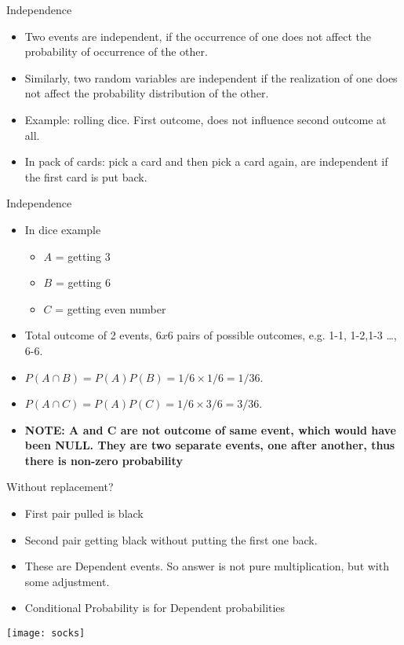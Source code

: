 \begin{frame}{Independence }

\begin{itemize}
\item Two events are independent, if the occurrence of one does not affect the probability of occurrence of the other.
\item Similarly, two random variables are independent if the realization of one does not affect the
probability distribution of the other.
\item Example: rolling dice. First outcome, does not influence second outcome at all.
\item In pack of cards: pick a card and then pick a card again, are independent if the first card is put back.
\end{itemize}
\end{frame}

\begin{frame}{Independence }
\begin{itemize}
\item In dice example  
\begin{itemize}
\item $A$  = getting 3  
\item  $B$ = getting 6
\item  $C$ = getting even number
\end{itemize}
\item Total outcome of 2 events, $6x6$ pairs of possible outcomes, e.g. 1-1, 1-2,1-3 \ldots, 6-6.
\item $P(A \cap B) = P(A)P(B) = 1/6 \times 1/6 = 1/36$. 
\item $P(A \cap C) = P(A)P(C) = 1/6 \times 3/6 = 3/36$. 
\item {\bf NOTE: A and C are not outcome of same event, which would have been NULL. They are two separate events, one after another, thus there is non-zero probability}
\end{itemize}
\end{frame}


\begin{frame}{Without replacement? }
\begin{itemize}
\item First pair pulled is black
\item Second pair getting black without putting the first one back.
\item These are Dependent events. So answer is not pure multiplication, but with some adjustment.
\item Conditional Probability is for Dependent probabilities
\end{itemize}
\begin{center}
\texttt{[image: socks]}
\end{center}
\end{frame}

